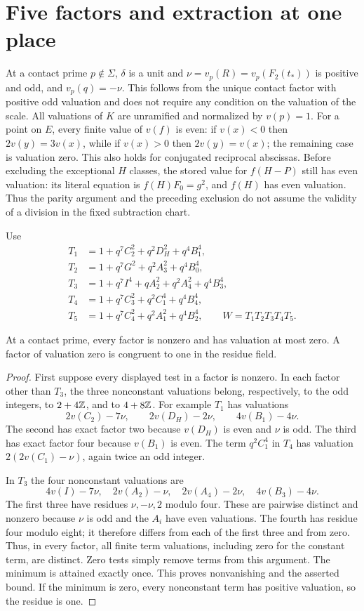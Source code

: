 \documentclass[11pt,a4paper]{article}
\begin{document}
\section{Five factors and extraction at one place}
At a contact prime $p\notin\Sigma$, $\delta$ is a unit and
$\nu=v_p(R)=v_p(F_2(t_*))$ is positive and odd, and $v_p(q)=-\nu$. This follows
from the unique contact factor with positive odd valuation and
does not require any condition on the valuation of the scale. All valuations
of $K$ are unramified and normalized by $v(p)=1$.
For a point on $E$, every finite value of $v(f)$ is even: if
$v(x)<0$ then $2v(y)=3v(x)$, while if $v(x)>0$ then
$2v(y)=v(x)$; the remaining case is valuation zero.
This also holds for conjugated reciprocal abscissas. Before excluding
the exceptional $H$ classes, the stored value for $f(H-P)$ still has even
valuation: its literal equation is $f(H)F_0=g^2$, and $f(H)$ has even
valuation. Thus the parity argument and the preceding exclusion do not
assume the validity of a division in the fixed subtraction chart.

Use
\begin{align*}
 T_1&=1+q^7C_2^2+q^2D_H^2+q^4B_1^4,\\
 T_2&=1+q^7G^2+q^2A_3^2+q^4B_0^4,\\
 T_3&=1+q^7I^4+qA_2^2+q^2A_4^2+q^4B_3^4,\\
 T_4&=1+q^7C_3^2+q^2C_1^4+q^4B_4^4,\\
 T_5&=1+q^7C_4^2+q^2A_1^2+q^4B_2^4,
 \qquad W=T_1T_2T_3T_4T_5.
\end{align*}

\begin{lemma}\label{lem:residues}
At a contact prime, every factor is nonzero and has valuation at most
zero. A factor of valuation zero is congruent to one in the residue field.
\end{lemma}
\begin{proof}
First suppose every displayed test in a factor is nonzero. In each
factor other than $T_3$, the three nonconstant valuations belong,
respectively, to the odd integers, to $2+4\mathbb Z$, and to $4+8\mathbb Z$.
For example $T_1$ has valuations
\[
 2v(C_2)-7\nu,\qquad 2v(D_H)-2\nu,\qquad4v(B_1)-4\nu.
\]
The second has exact factor two because $v(D_H)$ is even and $\nu$ is
odd. The third has exact factor four because $v(B_1)$ is even.
The term $q^2C_1^4$ in $T_4$ has valuation
$2(2v(C_1)-\nu)$, again twice an odd integer.

In $T_3$ the four nonconstant valuations are
\[
 4v(I)-7\nu,\quad 2v(A_2)-\nu,\quad
 2v(A_4)-2\nu,\quad4v(B_3)-4\nu.
\]
The first three have residues $\nu,-\nu,2$ modulo four. These are
pairwise distinct and nonzero because $\nu$ is odd and the $A_i$
have even valuations. The fourth has residue four modulo eight;
it therefore differs from each of the first three and from zero.
Thus, in every factor, all finite term valuations, including zero
for the constant term, are distinct. Zero tests simply remove terms
from this argument. The minimum is attained exactly once. This proves
nonvanishing and the asserted bound. If the minimum is zero, every
nonconstant term has positive valuation, so the residue is one.
\end{proof}
\end{document}

